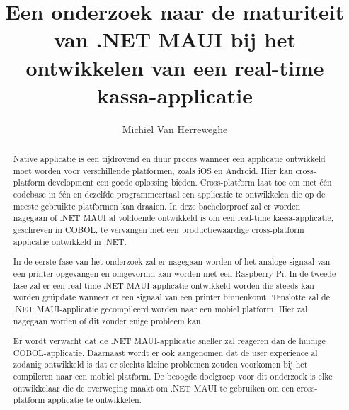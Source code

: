 \documentclass{hogent-article}
\title{Een onderzoek naar de maturiteit van .NET MAUI bij het ontwikkelen van een real-time kassa-applicatie}
\author{Michiel Van Herreweghe}
\begin{document}
\begin{abstract}
Native applicatie is een tijdrovend en duur proces wanneer een applicatie ontwikkeld moet worden voor verschillende platformen, zoals iOS en Android. Hier kan cross-platform development een goede oplossing bieden. Cross-platform laat toe om met één codebase in één en dezelfde programmeertaal een applicatie te ontwikkelen die op de meeste gebruikte platformen kan draaien. In deze bachelorproef zal er worden nagegaan of .NET MAUI al voldoende ontwikkeld is om een real-time kassa-applicatie, geschreven in COBOL, te vervangen met een productiewaardige cross-platform applicatie ontwikkeld in .NET.

In de eerste fase van het onderzoek zal er nagegaan worden of het analoge signaal van een printer opgevangen en omgevormd kan worden met een Raspberry Pi.
In de tweede fase zal er een real-time .NET MAUI-applicatie ontwikkeld worden die steeds kan worden geüpdate wanneer er een signaal van een printer binnenkomt.
Tenslotte zal de .NET MAUI-applicatie gecompileerd worden naar een mobiel platform. Hier zal nagegaan worden of dit zonder enige probleem kan.

Er wordt verwacht dat de .NET MAUI-applicatie sneller zal reageren dan de huidige COBOL-applicatie. Daarnaast wordt er ook aangenomen dat de user experience al zodanig ontwikkeld is dat er slechts kleine problemen zouden voorkomen bij het compileren naar een mobiel platform.
De beoogde doelgroep voor dit onderzoek is elke ontwikkelaar die de overweging maakt om .NET MAUI te gebruiken om een cross-platform applicatie te ontwikkelen.
\end{abstract}

\tableofcontents


\pagebreak
\printbibliography[heading=bibintoc]
\end{document}
